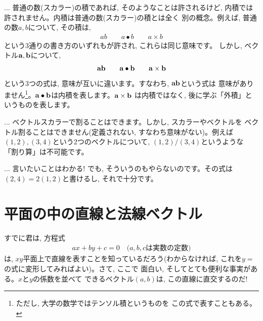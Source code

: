 \begin{freqmiss}{\small{} ... 
普通の数(スカラー)の積であれば, そのようなことは許されるけど, 
内積では許されません。内積は普通の数(スカラー)の積とは全く
別の概念。例えば, 普通の数$a, b$について, その積は, 
\begin{eqnarray*}
ab\quad\quad a\bullet b\quad\quad a\times b
\end{eqnarray*}
という3通りの書き方のいずれもが許され, これらは同じ意味です。
しかし, ベクトル${\bf a}, {\bf b}$について, 
\begin{eqnarray*}
{\bf a}{\bf b}\quad\quad{\bf a}\bullet{\bf b}\quad\quad{\bf a}\times{\bf b}
\end{eqnarray*}
という3つの式は, 意味が互いに違います。すなわち, ${\bf a}{\bf b}$という式は
意味がありません\footnote{ただし, 大学の数学ではテンソル積というものを
この式で表すこともある。}。${\bf a}\bullet{\bf b}$は内積を表します。${\bf a}\times{\bf b}$
は内積ではなく, 後に学ぶ「外積」というものを表します。}\end{freqmiss}\hv

\begin{faq}{\small{} ... 
ベクトルスカラーで割ることはできます。しかし, スカラーやベクトルを
ベクトル割ることはできません(定義されない, すなわち意味がない)。例えば
$(1, 2), (3, 4)$という2つのベクトルについて, $(1, 2)/(3, 4)$というような
「割り算」は不可能です。

 ... 
言いたいことはわかる! でも, そういうのもやらないのです。その式は
$(2, 4)=2(1, 2)$と書けるし, それで十分です。}\end{faq}
\vv

\section{平面の中の直線と法線ベクトル}

すでに君は, 方程式
\begin{eqnarray}
ax+by+c=0\quad\text{($a, b, c$は実数の定数)}\label{eq:axbyc_line}
\end{eqnarray}
は, $xy$平面上で直線を表すことを知っているだろう(わからなければ, 
これを$y=$の式に変形してみればよい)。さて, ここで
面白い, そしてとても便利な事実がある。$x$と$y$の係数を並べて
できるベクトル$(a, b)$は, この直線に直交するのだ!

